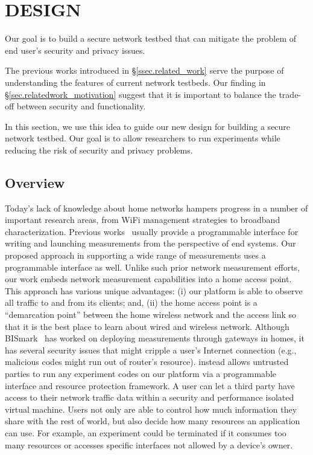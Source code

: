 \chapter{\sysname DESIGN}
\label{sec.design}
Our goal is to build a secure network testbed that can mitigate the problem 
of end user's security and privacy issues. 

The previous works introduced in \S{\ref{ssec.related_work}} serve the purpose of understanding the features of current network testbeds. Our finding in \S{\ref{sec.relatedwork_motivation}} suggest that it is important to balance the trade-off between security and functionality.

In this section, we use this idea to guide our new design for building a secure network testbed. Our goal is to allow researchers to run experiments while reducing the risk of security and privacy problems.

\section{Overview}
Today's lack of knowledge about home networks hampers progress in a number of important research areas, from WiFi management strategies to broadband characterization. Previous works~\cite{sanchez2014measurement,dhawan2012fathom} usually provide a programmable interface for writing and launching measurements from the perspective of end systems. Our proposed approach in supporting a wide range of measurements uses a programmable interface as well. Unlike such prior network measurement efforts, our work embeds network measurement capabilities into a home access point. This approach has various unique advantages: (i) our platform is able to observe all traffic to and from its clients; and, (ii) the home access point is a ``demarcation point'' between the home wireless network and the access link so that it is the best place to learn about wired and wireless network. Although BISmark~\cite{183951} has worked on deploying measurements through gateways in homes, it has several security issues that might cripple a user's Internet connection (e.g., malicious codes might run out of router's resource). \sysname instead allows untrusted parties to run any experiment codes on our platform via a programmable interface and resource protection framework. A user can let a third party have access to their network traffic data within a security and performance isolated virtual machine. Users not only are able to control how much information they share with the rest of world, but also decide how many resources an application can use. For example, an experiment could be terminated if it consumes too many resources or accesses specific interfaces not allowed by a device's owner. 

